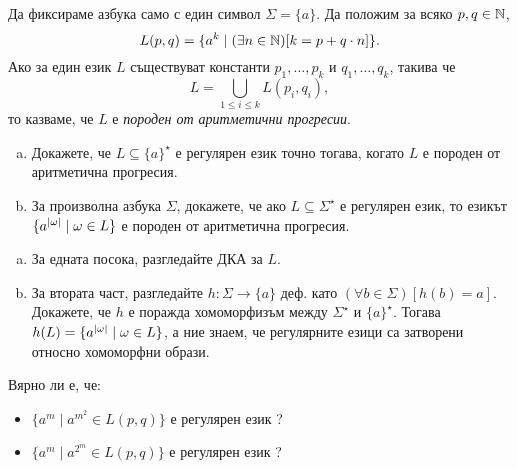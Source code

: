\begin{problem}
  Да фиксираме азбука само с един символ $\Sigma = \{a\}$.
  Да положим за всяко $p,q\in\mathbb{N}$, 
  \[L(p,q) = \{a^k \mid (\exists n\in\mathbb{N})[k = p+q\cdot n]\}.\]
  Ако за един език $L$ съществуват константи $p_1,\dots,p_k$ и $q_1,\dots,q_k$, такива че 
  \[L = \bigcup_{1\leq i \leq k} L(p_i,q_i),\]
  то казваме, че $L$ е {\em породен от аритметични прогресии}.
  \begin{enumerate}[a)]
  \item 
    Докажете, че $L \subseteq \{a\}^\star$ е регулярен език точно тогава, когато $L$ е породен от аритметична прогресия.
  \item
    За произволна азбука $\Sigma$, докажете, че ако $L \subseteq \Sigma^\star$ е регулярен език,
    то езикът $\{a^{\vert{\omega}\vert} \mid \omega \in L\}$  е породен от аритметична прогресия.    
  \end{enumerate}
\end{problem}
\begin{hint}
  \begin{enumerate}[a)]
  \item 
    За едната посока, разгледайте ДКА за $L$.
  \item
    За втората част, разгледайте $h:\Sigma\to\{a\}$ деф. като $(\forall b\in\Sigma)[h(b) = a]$.
    Докажете, че $h$ е поражда хомоморфизъм между $\Sigma^\star$ и $\{a\}^\star$.
    Тогава $h(L) = \{a^{\vert{\omega}\vert} \mid \omega \in L\}$, а
    ние знаем, че регулярните езици са затворени относно хомоморфни образи.  
  \end{enumerate}
\end{hint}

\begin{problem}
  Вярно ли е, че:
  \begin{itemize}
  \item 
    $\{a^m \mid a^{m^2} \in L(p,q)\}$ е регулярен език ?
  \item
    $\{a^m \mid a^{2^m} \in L(p,q)\}$ е регулярен език ?
  \end{itemize}
\end{problem}


